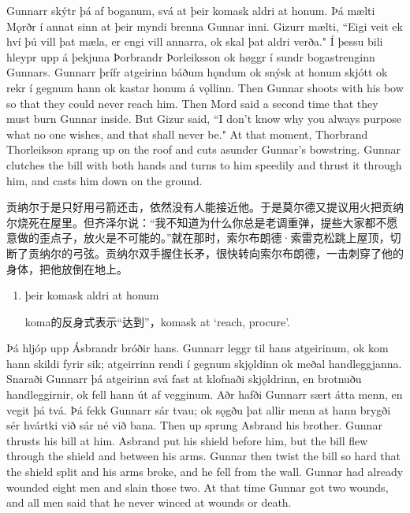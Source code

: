 \begin{paracol}{2}
  Gunnarr skýtr þá af boganum, svá at þeir komask aldri at honum. Þá mælti Mǫrðr í annat sinn at þeir myndi brenna Gunnar inni. Gizurr mælti, ``Eigi veit ek hví þú vill þat mæla, er engi vill annarra, ok skal þat aldri verða." Í þessu bili hleypr upp á þekjuna Þorbrandr Þorleiksson ok høggr í sundr bogastrenginn Gunnars. Gunnarr þrífr atgeirinn báðum hǫndum ok snýsk at honum skjótt ok rekr í gegnum hann ok kastar honum á vǫllinn.
  \switchcolumn
  Then Gunnar shoots with his bow so that they could never reach him. Then Mord said a second time that they must burn Gunnar inside. But Gizur said, ``I don't know why you always purpose what no one wishes, and that shall never be." At that moment, Thorbrand Thorleikson sprang up on the roof and cuts asunder Gunnar's bowstring. Gunnar clutches the bill with both hands and turns to him speedily and thrust it through him, and casts him down on the ground.
\end{paracol}
\begin{translation*}{}
  贡纳尔于是只好用弓箭还击，依然没有人能接近他。于是莫尔德又提议用火把贡纳尔烧死在屋里。但齐泽尔说：“我不知道为什么你总是老调重弹，提些大家都不愿意做的歪点子，放火是不可能的。”就在那时，索尔布朗德·索雷克松跳上屋顶，切断了贡纳尔的弓弦。贡纳尔双手握住长矛，很快转向索尔布朗德，一击刺穿了他的身体，把他放倒在地上。
\end{translation*}
\begin{grammar*}{}
  \begin{enumerate}[leftmargin=*]
    \item þeir komask aldri at honum

          koma的反身式表示“达到”，komask at `reach, procure'.
  \end{enumerate}
\end{grammar*}
\begin{paracol}{2}
  Þá hljóp upp Ásbrandr bróðir hans. Gunnarr leggr til hans atgeirinum, ok kom hann skildi fyrir sik; atgeirrinn rendi í gegnum skjǫldinn ok meðal handleggjanna. Snaraði Gunnarr þá atgeirinn svá fast at klofnaði skjǫldrinn, en brotnuðu handleggirnir, ok fell hann út af vegginum. Aðr hafði Gunnarr sært átta menn, en vegit þá tvá. Þá fekk Gunnarr sár tvau; ok sǫgðu þat allir menn at hann brygði sér hvártki við sár né við bana.
  \switchcolumn
  Then up sprung Asbrand his brother. Gunnar thrusts his bill at him. Asbrand put his shield before him, but the bill flew through the shield and between his arms. Gunnar then twist the bill so hard that the shield split and his arms broke, and he fell from the wall. Gunnar had already wounded eight men and slain those two. At that time Gunnar got two wounds, and all men said that he never winced at wounds or death.
\end{paracol}
